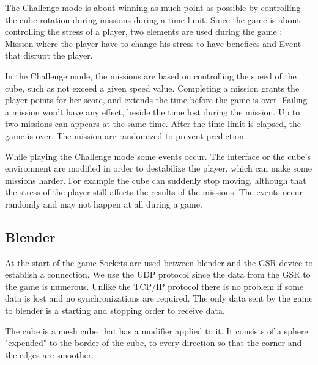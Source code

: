\documentclass[12pt,a4paper]{article}
\begin{document}
The Challenge mode is about winning as much point as possible by controlling the cube rotation during missions during a time limit. Since the game is about controlling the stress of a player, two elements are used during the game : Mission where the player have to change his stress to have benefices and Event that disrupt the player.

In the Challenge mode, the missions are based on controlling the speed of the cube, such as not exceed a given speed value. Completing a mission grants the player points for her score, and extends the time before the game is over. Failing a mission won't have any effect, beside the time lost during the mission. Up to two missions can appears at the same time. After the time limit is elapsed, the game is over. The mission are randomized  to prevent prediction.

While playing the Challenge mode some events occur. The interface or the cube's environment are modified in order to destabilize the player, which can make some missions harder. For example the cube can suddenly stop moving, although that the stress of the player still affects the results of the missions. The events occur randomly and may not happen at all during a game.

%


\subsection{Blender}

At the start of the game Sockets are used between blender and the GSR device to establish a connection. We use the UDP protocol since the data from the GSR to the game is numerous. Unlike the TCP/IP protocol there is no problem if some data is lost and no synchronizations are required. The only data sent by the game to blender is a starting and stopping order to receive data.


The cube is a mesh cube that has a modifier applied to it. It consists of a sphere "expended" to the border of the cube, to every direction so that the corner and the edges are smoother.
\end{document}
